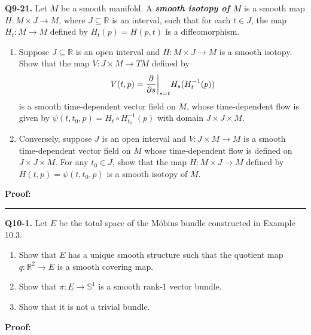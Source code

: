 \documentclass{article}
\newcommand{\R}{\mathbb{R}}
\newcommand{\restr}[2]{{%
  \left.\kern-\nulldelimiterspace %
  #1 %
  \vphantom{\big|} %
  \right|_{#2} %
  }}
\begin{document}
\textbf{Q9-21.} Let $M$ be a smooth manifold. A \emph{\textbf{smooth isotopy of $M$}} is a smooth map $H : M \times J \rightarrow M$, where $J \subseteq \R$ is an interval, such that for each $t \in J$, the map $H_t : M \rightarrow M$ defined by $H_t(p) = H(p, t)$ is a diffeomorphism.
\begin{enumerate}[label=(\alph*)]
  \item Suppose $J \subseteq \R$ is an open interval and $H : M \times J \rightarrow M$ is a smooth isotopy. Show that the map $V : J \times M \rightarrow TM$ defined by 
  \[ V(t, p) = \restr{\frac{\partial}{\partial s}}{s=t} H_s(H_{t}^{-1}(p))  \] is a smooth time-dependent vector field on $M$, whose time-dependent flow is given by $\psi(t, t_0, p) = H_t \circ H_{{t_0}}^{-1}(p)$ with domain $J \times J \times M$.

  \item Conversely, suppose $J$ is an open interval and $V : J \times M \rightarrow M$ is a smooth time-dependent vector field on $M$ whose time-dependent flow is defined on $J \times J \times M$. For any $t_0 \in J$, show that the map $H : M \times J \rightarrow M$ defined by $H(t, p) = \psi(t, t_0, p)$ is a smooth isotopy of $M$.
\end{enumerate} 

\vskip 0.5cm
\textbf{Proof:}


\vskip 0.5cm
\hrule 
\vskip 0.5cm


\textbf{Q10-1.} Let $E$ be the total space of the Möbius bundle constructed in Example 10.3.
\begin{enumerate}[label=(\alph*)]
  \item Show that $E$ has a unique smooth structure such that the quotient map $q : \R^2 \rightarrow E$ is a smooth covering map.
  \item Show that $\pi : E \rightarrow \mathbb{S}^1$ is a smooth rank-1 vector bundle.
  \item Show that it is not a trivial bundle.
\end{enumerate}

\vskip 0.5cm
\textbf{Proof:}
\end{document}
